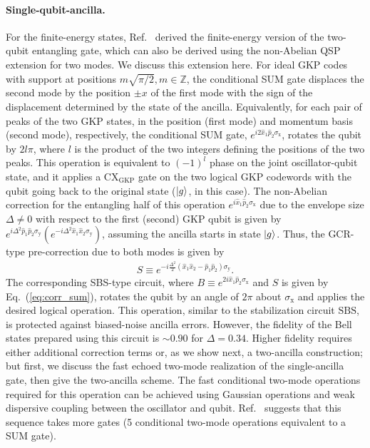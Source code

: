 \documentclass[aps,prx,showpacs,notitlepage,twocolumn,superscriptaddress,nofootinbib,preprintnumbers,floatfix,10pt, longbibliography]{revtex4-2}
\begin{document}
\paragraph{Single-qubit-ancilla.} For the finite-energy states, Ref.~\cite{rojkov2023two} derived the finite-energy version of the two-qubit entangling gate, which can also be derived using the non-Abelian QSP extension for two modes. We discuss this extension here. For ideal GKP codes with support at positions $m\sqrt{\pi/2}, m\in \mathbb{Z}$, the conditional SUM gate displaces the second mode by the position $\pm x$ of the first mode with the sign of the displacement determined by the state of the ancilla. Equivalently, for each pair of peaks of the two GKP states, in the position (first mode) and momentum basis (second mode), respectively, the conditional SUM gate, $e^{i2\hat x_1\hat p_2\sigma_\mathrm{x}}$, rotates the qubit by $2l\pi$, where $l$ is the product of the two integers defining the positions of the two peaks. This operation is equivalent to $(-1)^l$ phase on the joint oscillator-qubit state, and it applies a $\mathrm{CX}_\mathrm{GKP}$ gate on the two logical GKP codewords with the qubit going back to the original state ($\ket{g}$, in this case). The non-Abelian correction for the entangling half of this operation $e^{i\hat x_1\hat p_2\sigma_\mathrm{x}}$ due to the envelope size $\Delta\neq 0$ with respect to the first (second) GKP qubit is given by $e^{i\Delta^2\hat p_1 \hat p_2 \sigma_\mathrm{y}}(e^{-i\Delta^2\hat x_1\hat x_2 \sigma_\mathrm{y}})$, assuming the ancilla starts in state $\ket{g}$. Thus, the GCR-type pre-correction due to both modes is given by
\begin{align}
  S\equiv e^{-i\frac{\Delta^2}{2}(\hat x_1\hat x_2-\hat p_1\hat p_2) \sigma_\mathrm{y}}.\label{eq:corr_sum}
\end{align}
The corresponding SBS-type circuit, where $B\equiv e^{2i\hat x_1\hat p_2\sigma_\mathrm{x}}$ and $S$ is given by Eq.~(\ref{eq:corr_sum}), rotates the qubit by an angle of $2\pi$ about $\sigma_\mathrm{x}$ and applies the desired logical operation. This operation, similar to the stabilization circuit $\mathrm{SBS}$, is protected against biased-noise ancilla errors. However, the fidelity of the Bell states prepared using this circuit is $\sim 0.90$ for $\Delta=0.34$. Higher fidelity requires either additional correction terms or, as we show next, a two-ancilla construction; but first, we discuss the fast echoed two-mode realization of the single-ancilla gate, then give the two-ancilla scheme. The fast conditional two-mode operations required for this operation can be achieved using Gaussian operations and weak dispersive coupling between the oscillator and qubit. Ref.~\cite{rojkov2023two} suggests that this sequence takes more gates (5 conditional two-mode operations equivalent to a SUM gate). 
\end{document}
